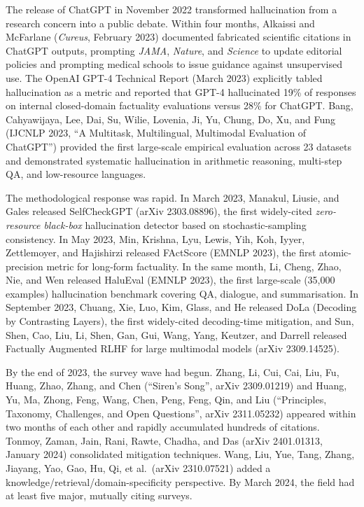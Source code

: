 \documentclass{article}
\begin{document}
The release of ChatGPT in November 2022 transformed hallucination from a research concern into a public debate. Within four months, Alkaissi and McFarlane (\emph{Cureus}, February 2023) documented fabricated scientific citations in ChatGPT outputs, prompting \emph{JAMA}, \emph{Nature}, and \emph{Science} to update editorial policies and prompting medical schools to issue guidance against unsupervised use. The OpenAI GPT-4 Technical Report (March 2023) explicitly tabled hallucination as a metric and reported that GPT-4 hallucinated 19\% of responses on internal closed-domain factuality evaluations versus 28\% for ChatGPT. Bang, Cahyawijaya, Lee, Dai, Su, Wilie, Lovenia, Ji, Yu, Chung, Do, Xu, and Fung (IJCNLP 2023, ``A Multitask, Multilingual, Multimodal Evaluation of ChatGPT'') provided the first large-scale empirical evaluation across 23 datasets and demonstrated systematic hallucination in arithmetic reasoning, multi-step QA, and low-resource languages.

The methodological response was rapid. In March 2023, Manakul, Liusie, and Gales released SelfCheckGPT (arXiv 2303.08896), the first widely-cited \emph{zero-resource black-box} hallucination detector based on stochastic-sampling consistency. In May 2023, Min, Krishna, Lyu, Lewis, Yih, Koh, Iyyer, Zettlemoyer, and Hajishirzi released FActScore (EMNLP 2023), the first atomic-precision metric for long-form factuality. In the same month, Li, Cheng, Zhao, Nie, and Wen released HaluEval (EMNLP 2023), the first large-scale (35,000 examples) hallucination benchmark covering QA, dialogue, and summarisation. In September 2023, Chuang, Xie, Luo, Kim, Glass, and He released DoLa (Decoding by Contrasting Layers), the first widely-cited decoding-time mitigation, and Sun, Shen, Cao, Liu, Li, Shen, Gan, Gui, Wang, Yang, Keutzer, and Darrell released Factually Augmented RLHF for large multimodal models (arXiv 2309.14525).

By the end of 2023, the survey wave had begun. Zhang, Li, Cui, Cai, Liu, Fu, Huang, Zhao, Zhang, and Chen (``Siren's Song'', arXiv 2309.01219) and Huang, Yu, Ma, Zhong, Feng, Wang, Chen, Peng, Feng, Qin, and Liu (``Principles, Taxonomy, Challenges, and Open Questions'', arXiv 2311.05232) appeared within two months of each other and rapidly accumulated hundreds of citations. Tonmoy, Zaman, Jain, Rani, Rawte, Chadha, and Das (arXiv 2401.01313, January 2024) consolidated mitigation techniques. Wang, Liu, Yue, Tang, Zhang, Jiayang, Yao, Gao, Hu, Qi, et al.~(arXiv 2310.07521) added a knowledge/retrieval/domain-specificity perspective. By March 2024, the field had at least five major, mutually citing surveys.
\end{document}
